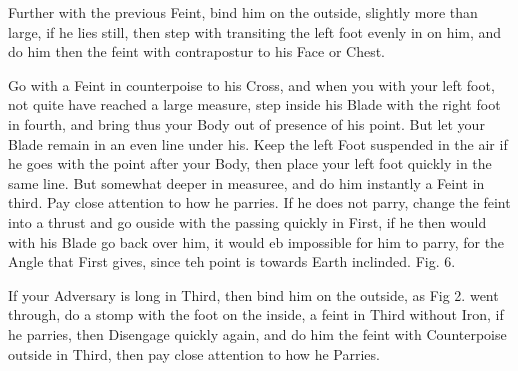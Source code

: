 \exercise{}
Further with the previous Feint, bind him on the outside, slightly
more than large, if he lies still, then step with transiting the left
foot evenly in on him, and do him then the feint with contrapostur to
his Face or Chest.


\exercise{}
Go with a Feint in counterpoise to his Cross, and when you with your
left foot, not quite have reached a large measure, step inside his
Blade with the right foot in fourth, and bring thus your Body out of
presence of his point. But let your Blade remain in an even line under
his. Keep the left
Foot suspended in the air if he goes with the point after your Body, then place your left foot quickly in the same line. But somewhat deeper in measuree, and do him instantly a Feint in third. Pay close attention to how he parries.
If he does not parry, change the feint into a thrust and go ouside with the passing quickly in First, if he then would with his Blade go back over him, it would eb impossible for him to parry, for the Angle that First gives, since teh point is towards Earth inclinded. Fig. 6.



If your Adversary is long in Third, then bind him on the outside, as
Fig 2. went through, do a stomp with the foot on the inside, a feint
in Third without Iron, if he parries, then Disengage quickly again,
and do him the feint with Counterpoise outside in Third, then pay
close attention to how he Parries.
